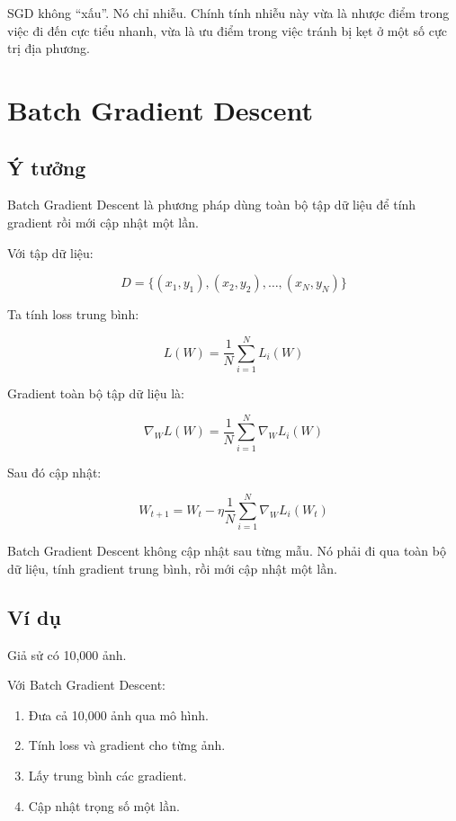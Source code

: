 \documentclass[12pt,a4paper]{report}
\begin{document}
\begin{luuy}
SGD không ``xấu''. Nó chỉ nhiễu. Chính tính nhiễu này vừa là nhược điểm trong việc đi đến cực tiểu nhanh, vừa là ưu điểm trong việc tránh bị kẹt ở một số cực trị địa phương.
\end{luuy}

\chapter{Batch Gradient Descent}

\section{Ý tưởng}

Batch Gradient Descent là phương pháp dùng toàn bộ tập dữ liệu để tính gradient rồi mới cập nhật một lần.

Với tập dữ liệu:

\[
    D=\{(x_1,y_1),(x_2,y_2),\ldots,(x_N,y_N)\}
\]

Ta tính loss trung bình:

\[
    L(W)
    =
    \frac{1}{N}
    \sum_{i=1}^{N}L_i(W)
\]

Gradient toàn bộ tập dữ liệu là:

\[
    \nabla_W L(W)
    =
    \frac{1}{N}
    \sum_{i=1}^{N}
    \nabla_W L_i(W)
\]

Sau đó cập nhật:

\[
    W_{t+1}
    =
    W_t
    -
    \eta
    \frac{1}{N}
    \sum_{i=1}^{N}
    \nabla_W L_i(W_t)
\]

\begin{ghinho}
Batch Gradient Descent không cập nhật sau từng mẫu. Nó phải đi qua toàn bộ dữ liệu, tính gradient trung bình, rồi mới cập nhật một lần.
\end{ghinho}

\section{Ví dụ}

Giả sử có 10,000 ảnh.

Với Batch Gradient Descent:

\begin{enumerate}
    \item Đưa cả 10,000 ảnh qua mô hình.
    \item Tính loss và gradient cho từng ảnh.
    \item Lấy trung bình các gradient.
    \item Cập nhật trọng số một lần.
\end{enumerate}
\end{document}
